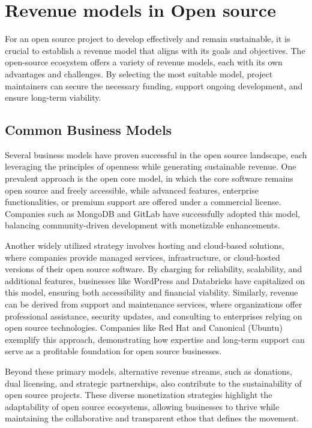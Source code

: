\cite{Open-Source-EMR-Software}

\section{Revenue models in Open source}

For an open source project to develop effectively and remain sustainable, it is crucial to establish a revenue model that aligns with its goals and objectives. The open-source ecosystem offers a variety of revenue models, each with its own advantages and challenges. By selecting the most suitable model, project maintainers can secure the necessary funding, support ongoing development, and ensure long-term viability.

\subsection{Common Business Models}
Several business models have proven successful in the open source landscape, each leveraging the principles of openness while generating sustainable revenue. One prevalent approach is the open core model, in which the core software remains open source and freely accessible, while advanced features, enterprise functionalities, or premium support are offered under a commercial license. Companies such as MongoDB and GitLab have successfully adopted this model, balancing community-driven development with monetizable enhancements.  

Another widely utilized strategy involves hosting and cloud-based solutions, where companies provide managed services, infrastructure, or cloud-hosted versions of their open source software. By charging for reliability, scalability, and additional features, businesses like WordPress and Databricks have capitalized on this model, ensuring both accessibility and financial viability. Similarly, revenue can be derived from support and maintenance services, where organizations offer professional assistance, security updates, and consulting to enterprises relying on open source technologies. Companies like Red Hat and Canonical (Ubuntu) exemplify this approach, demonstrating how expertise and long-term support can serve as a profitable foundation for open source businesses.  

Beyond these primary models, alternative revenue streams, such as donations, dual licensing, and strategic partnerships, also contribute to the sustainability of open source projects. These diverse monetization strategies highlight the adaptability of open source ecosystems, allowing businesses to thrive while maintaining the collaborative and transparent ethos that defines the movement.

